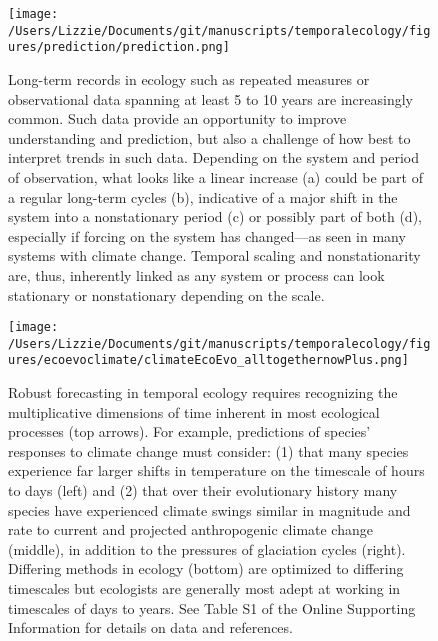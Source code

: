 \documentclass[11pt,a4paper,oneside]{article}
\begin{document}
\begin{figure}[h!]
\centering
\noindent \texttt{[image: /Users/Lizzie/Documents/git/manuscripts/temporalecology/figures/prediction/prediction.png]}
\caption{Long-term records in ecology such as repeated measures or observational data spanning at least 5 to 10 years are increasingly common. Such data provide an opportunity to improve understanding and prediction, but also a challenge of how best to interpret trends in such data. Depending on the system and period of observation, what looks like a linear increase (a) could be part of a regular long-term cycles (b), indicative of a major shift in the system into a nonstationary period (c) or possibly part of both (d), especially if forcing on the system has changed---as seen in many systems with climate change. Temporal scaling and nonstationarity are, thus, inherently linked as any system or process can look stationary or nonstationary depending on the scale.}
\end{figure}

\newpage
\begin{figure}[h!]
\centering
\noindent \texttt{[image: /Users/Lizzie/Documents/git/manuscripts/temporalecology/figures/ecoevoclimate/climateEcoEvo\_alltogethernowPlus.png]}
\caption{Robust forecasting in temporal ecology requires recognizing the multiplicative dimensions of time inherent in most ecological processes (top arrows). For example, predictions of species' responses to climate change must consider: (1) that many species experience far larger shifts in temperature on the timescale of hours to days (left) and (2) that over their evolutionary history many species have experienced climate swings similar in magnitude and rate to current and projected anthropogenic climate change (middle), in addition to the pressures of glaciation cycles (right). Differing methods in ecology (bottom) are optimized to differing timescales but ecologists are generally most adept at working in timescales of days to years. See Table S1 of the Online Supporting Information for details on data and references.}
\end{figure}
\end{document}
